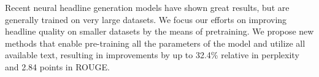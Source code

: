 Recent neural headline generation models have shown great results, but are generally trained on very large datasets. We focus our efforts on improving headline quality on smaller datasets by the means of pretraining. We propose new methods that enable pre-training all the parameters of the model and utilize all available text, resulting in improvements by up to 32.4\% relative in perplexity and 2.84 points in ROUGE.
